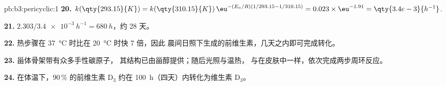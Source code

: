 \begin{solution}{pb:b3:pericyclic:1}
\textbf{20.} $k(\qty{293.15}{K}) = k(\qty{310.15}{K})\,\eu^{-(E_a/R)(1/293.15 - 1/310.15)} = 0.023 \times \eu^{-1.91} = \qty{3.4e-3}{h^{-1}}$.

\textbf{21.} $2.303/\qty{3.4e-3}{h^{-1}} = \qty{680}{h}$，约 28 天。

\textbf{22.} 热步骤在 \qty{37}{\celsius} 时比在 \qty{20}{\celsius} 时快 7 倍，因此
晨间日照下生成的前维生素，几天之内即可完成转化。

\textbf{23.} 甾体骨架带有众多手性碳原子，
其结构已由甾醇提供；随后光照与温热，
与在皮肤中一样，依次完成两步周环反应。

\textbf{24.} 在体温下，90\,\% 的前维生素 D$_3$ 约在
\qty{100}{h}（四天）内转化为维生素 D$_3$。
\end{solution}
